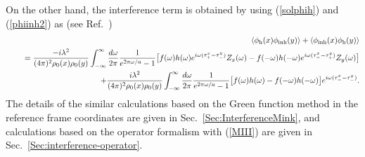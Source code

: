 \documentclass[aps,prd,preprintnumbers,nofootinbib,showpacs]{revtex4}%
\begin{document}
\begin{widetext}
On the other hand, the interference term is obtained by using  (\ref{solphih}) and
 (\ref{phiinh2}) as (see Ref.~\cite{IYZ2013}) 
\begin{eqnarray}
&&
\langle\phi_{\rm h}(x)\phi_{\rm inh}(y)\rangle
+\langle\phi_{\rm inh}(x)\phi_{\rm h}(y)\rangle
\nonumber\\
&%
  &~~~~= {-i\lambda^2\over (4\pi)^2\rho_0(x)\rho_0(y)}
  \int _{-\infty}^{\infty}{d\omega\over2\pi}{1
\over e^{2\pi\omega/a}-1}
\bigr[f(\omega)h(\omega)e^{i\omega(\tau_+^x-\tau_-^y)}Z_x(\omega)
-f(-\omega)h(-\omega)e^{i\omega(\tau_-^x-\tau_+^y)}Z_y(\omega)\bigl]
\nonumber
\\
&&~~~~+{i\lambda^2\over (4\pi)^2\rho_0(x)\rho_0(y)}
  \int _{-\infty}^{\infty}{d\omega\over2\pi}{1\over e^{2\pi\omega/a}-1}
\bigr[f(\omega)h(\omega)-f(-\omega)h(-\omega)\bigl]e^{i\omega(\tau_-^x-\tau_-^y)} .
\label{interferenceall}
\end{eqnarray}
The details of the similar calculations based on the Green function method in the 
reference frame coordinates
are given in Sec.~\ref{Sec:InterferenceMink}, and calculations based on the operator formalism
with (\ref{MIII}) are given in Sec.~\ref{Sec:interference-operator}. 


\end{widetext}
\end{document}
